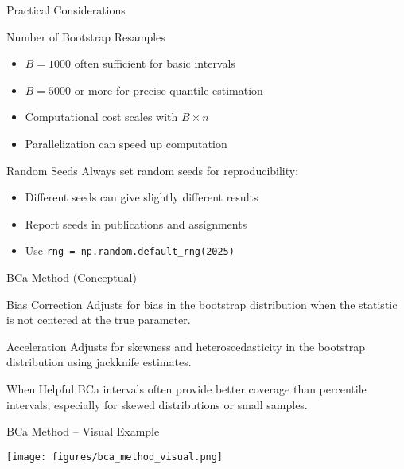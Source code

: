 \begin{frame}{Practical Considerations}
  \begin{block}{Number of Bootstrap Resamples}
    \begin{itemize}
      \item $B = 1000$ often sufficient for basic intervals
      \item $B = 5000$ or more for precise quantile estimation
      \item Computational cost scales with $B \times n$
      \item Parallelization can speed up computation
    \end{itemize}
  \end{block}

  \begin{block}{Random Seeds}
    Always set random seeds for reproducibility:
    \begin{itemize}
      \item Different seeds can give slightly different results
      \item Report seeds in publications and assignments
      \item Use \texttt{rng = np.random.default\_rng(2025)}
    \end{itemize}
  \end{block}
\end{frame}

\begin{frame}{BCa Method (Conceptual)}
  \begin{block}{Bias Correction}
    Adjusts for bias in the bootstrap distribution when the statistic
    is not centered at the true parameter.
  \end{block}

  \begin{block}{Acceleration}
    Adjusts for skewness and heteroscedasticity in the bootstrap
    distribution using jackknife estimates.
  \end{block}

  \begin{block}{When Helpful}
    BCa intervals often provide better coverage than percentile intervals,
    especially for skewed distributions or small samples.
  \end{block}
\end{frame}

\begin{frame}{BCa Method -- Visual Example}
  \begin{center}
    \texttt{[image: figures/bca\_method\_visual.png]}
  \end{center}
\end{frame}

